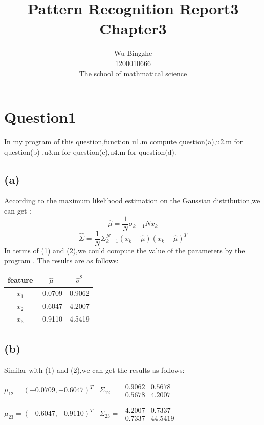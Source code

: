 \documentclass[10pt,a4paper]{article}
\author{Wu Bingzhe\\1200010666\\The school of mathmatical science}
\title{Pattern Recognition Report3\\Chapter3}
\begin{document}
	\maketitle
	\section{Question1}
    In my program of this question,function u1.m compute question(a),u2.m for question(b)
    ,u3.m for question(c),u4.m for question(d).
    \subsection{(a)}
		According to the maximum likelihood estimation on the Gaussian distribution,we can 
		get :
		\begin{equation}
			\hat{\mu}=\dfrac{1}{N}\sigma_{k=1}{N}x_k
		\end{equation}	
		\begin{equation}
			\hat{\Sigma}=\dfrac{1}{N}\Sigma_{k=1}^{N}(x_k-\hat{\mu})(x_k-\hat{\mu})^{T}
		\end{equation}
		In terms of (1) and (2),we could compute the value of the parameters 
		by the program . The results are as follows:
	    \begin{center}
		\begin{tabular}{|c|c|c|}
			\hline  feature& $\hat{\mu}$  & $\hat{\sigma}^2$  \\ 
			\hline  $x_1$& -0.0709 & 0.9062   \\ 
			\hline  $x_2$&  -0.6047& 4.2007  \\ 
			\hline  $x_3$&  -0.9110&  4.5419 \\ 
			\hline 
		\end{tabular} 
		\end{center}	
	\subsection{(b)}
	Similar with (1) and (2),we can get the results as follows:
	
	$\mu_{12}=(-0.0709,-0.6047)^T$ \ $\Sigma_{12}=$
	$\begin{array}{cc}
		0.9062& 0.5678  \\ 
	    0.5678& 4.2007 
	\end{array} 
	$
	
	$\mu_{23}=(-0.6047,-0.9110)^T$ \ $\Sigma_{23}=$
	$\begin{array}{cc}
	4.2007& 0.7337  \\ 
	0.7337& 44.5419 
	\end{array} 
	$
	
\end{document}
